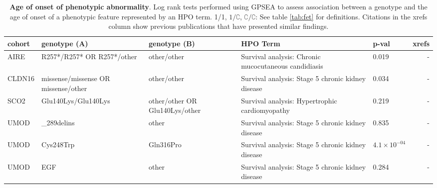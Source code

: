 \begin{table}
\centering
\begin{tabular}{l>{\raggedright\arraybackslash}p{3.5cm}>{\raggedright\arraybackslash}p{2.5cm}>{\raggedright\arraybackslash}p{4cm}lr}
\toprule
\textbf{cohort} & \textbf{genotype (A)} & \textbf{genotype (B)} & \textbf{HPO Term} & \textbf{p-val} & \textbf{xrefs}\\
\midrule
AIRE & R257*/R257* OR R257*/other & other/other & Survival analysis: Chronic mucocutaneous candidiasis & 0.019 & -\\
CLDN16 & missense/missense OR missense/other & other/other & Survival analysis: Stage 5 chronic kidney disease & 0.034 & -\\
SCO2 & Glu140Lys/Glu140Lys & other/other OR Glu140Lys/other & Survival analysis: Hypertrophic cardiomyopathy & 0.219 & -\\
UMOD & 278_289delins & other & Survival analysis: Stage 5 chronic kidney disease & 0.835 & -\\
UMOD & Cys248Trp & Gln316Pro & Survival analysis: Stage 5 chronic kidney disease & $4.1 \times 10^{-04}$ & -\\
UMOD & EGF & other & Survival analysis: Stage 5 chronic kidney disease & 0.284 & -\\
\bottomrule
\end{tabular}
\caption{\textbf{Age of onset of phenotypic abnormality}. Log rank tests performed using GPSEA to assess association between a genotype and the 
age of onset of a phenotypic feature represented by an HPO term.  1/1, $1/\complement$, $\complement/\complement$: See table \ref{tab:fet} for definitions. Citations in the xrefs column show previous publications that have presented similar findings.}
\label{tab:hpo_onset}
\end{table}
\clearpage
\newpage



